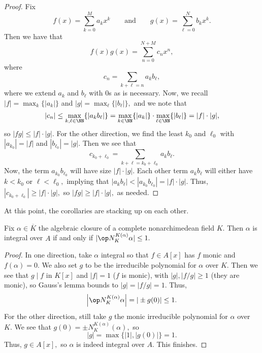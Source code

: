 \documentclass[../notes.tex]{subfiles}
\begin{document}
\begin{proof}
	Fix
	\[f(x)=\sum_{k=0}^Ma_kx^k\qquad\text{and}\qquad g(x)=\sum_{\ell=0}^Nb_kx^k.\]
	Then we have that
	\[f(x)g(x)=\sum_{n=0}^{N+M}c_n x^n,\]
	where
	\[c_n=\sum_{k+\ell=n}a_kb_\ell,\]
	where we extend $a_k$ and $b_\ell$ with $0$s as is necessary. Now, we recall $|f|=\max_k\{|a_k|\}$ and $|g|=\max_\ell\{|b_\ell|\},$ and we note that
	\[|c_n|\le\max_{k,\ell\in\NN}\{|a_kb_\ell|\}=\max_{k\in\NN}\{|a_k|\}\cdot\max_{\ell\in\NN}\{|b_\ell|\}=|f|\cdot|g|,\]
	so $|fg|\le|f|\cdot|g|.$ For the other direction, we find the least $k_0$ and $\ell_0$ with $|a_{k_0}|=|f|$ and $|b_{\ell_0}|=|g|.$ Then we see that
	\[c_{k_0+\ell_0}=\sum_{k+\ell=k_0+\ell_0}a_kb_\ell.\]
	Now, the term $a_{k_0}b_{\ell_0}$ will have size $|f|\cdot|g|.$ Each other term $a_kb_\ell$ will either have $k<k_0$ or $\ell<\ell_0,$ implying that $|a_kb_\ell|<|a_{k_0}b_{\ell_0}|=|f|\cdot|g|.$ Thus, $|c_{k_0+\ell_0}|\ge|f|\cdot|g|,$ so $|fg|\ge|f|\cdot|g|,$ as needed.
\end{proof}
At this point, the corollaries are stacking up on each other.
\begin{corollary} \label{cor:corsquared}
	Fix $\alpha\in\overline K$ the algebraic closure of a complete nonarchimedean field $K.$ Then $\alpha$ is integral over $A$ if and only if $|\op N_K^{K(\alpha)}\alpha|\le1.$
\end{corollary}
\begin{proof}
	In one direction, take $\alpha$ integral so that $f\in A[x]$ has $f$ monic and $f(\alpha)=0.$ We also set $g$ to be the irreducible polynomial for $\alpha$ over $K.$ Then we see that $g\mid f$ in $K[x]$ and $|f|=1$ ($f$ is monic), with $|g|,|f/g|\ge1$ (they are monic), so Gauss's lemma bounds to $|g|=|f/g|=1.$ Thus,
	\[\left|\op N_K^{K(\alpha)}\alpha\right|=|\pm g(0)|\le1.\]
	For the other direction, still take $g$ the monic irreducible polynomial for $\alpha$ over $K.$ We see that $g(0)=\pm N_K^{K(\alpha)}(\alpha),$ so
	\[|g|=\max\{|1|,|g(0)|\}=1.\]
	Thus, $g\in A[x],$ so $\alpha$ is indeed integral over $A.$ This finishes.
\end{proof}
\end{document}
